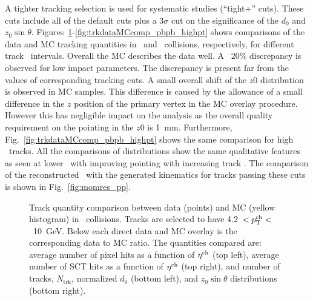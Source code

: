  

A tighter tracking selection is used for systematic studies (``tight+'' cuts).  These cuts include all of the default
cuts plus a 3$\sigma$ cut on the significance of the $d_0$ and $z_0 \sin\theta$.
Figures~\ref{fig:trkdataMCcomp_pp}-\ref{fig:trkdataMCcomp_pbpb_highpt}
shows comparisons of the data and MC tracking quantities in \pp\ and
\pbpb\ collisions, respectively, for different track \pT\ intervals.  Overall the MC describes the data well. A ~20\% discrepancy is observed for low impact parameters. The discrepancy is present far from the values of corresponding tracking cuts. A small overall shift of the $z0$ distribution is observed in MC samples. This difference is caused by the allowance of a small difference in the $z$ position of the primary vertex in the MC overlay procedure. However this has negligible impact on the analysis as the overall quality requirement on the pointing in the $z0$ is 1~mm. Furthermore, Fig.~\ref{fig:trkdataMCcomp_pbpb_highpt} shows the same comparison for high \pt\ tracks. All the comparisons of distributions show the same qualitative features as seen at lower \pt\ with improving pointing with increasing track \pt. The comparison of the reconstructed \pttrk\ with the generated
kinematics for tracks passing these cuts is shown in Fig.~\ref{fig:momres_pp}.

\begin{figure}
\caption{Track quantity comparison between data (points) and MC (yellow histogram) in \pp\ collisions.  
Tracks are selected to have 4.2~$<\mbox{$p_{\mathrm{T}}^{\mathrm{ch}}$}<$~10~GeV. Below each direct data and MC overlay is the 
corresponding data to MC ratio.  The quantities compared are: average number of pixel hits as a function
of $\mbox{$\eta^{\mathrm{ch}}$}$ (top left), average number of SCT hits as a function of $\mbox{$\eta^{\mathrm{ch}}$}$ (top right),
and number of tracks, $N_{\mathrm{trk}}$, normalized $d_0$ (bottom left), and $z_0 \sin\theta$ distributions (bottom right).}
\label{fig:trkdataMCcomp_pp}
\end{figure}

